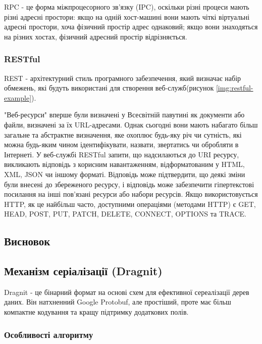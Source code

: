 \documentclass{lib/styles/default-style}
\begin{document}
    RPC - це форма міжпроцесорного зв'язку (IPC), оскільки різні процеси
    мають різні адресні простори: якщо на одній хост-машині вони мають чіткі віртуальні
    адресні простори, хоча фізичний простір адрес однаковий; якщо вони знаходяться на різних хостах,
    фізичний адресний простір відрізняється.

    \subsubsection{RESTful}
    
    REST - архітектурний стиль програмного забезпечення, який визначає набір обмежень,
    які будуть використані для створення веб-служб(рисунок \ref{img:restful-example}).
    

    "Веб-ресурси" вперше були визначені у Всесвітній павутині як документи або файли, визначені за їх URL-адресами.
    Однак сьогодні вони мають набагато більш загальне та абстрактне визначення, яке охоплює будь-яку річ чи сутність,
    які можна будь-яким чином ідентифікувати, назвати, звертатись чи обробляти в Інтернеті.
    У веб-службі RESTful запити, що надсилаються до URI ресурсу, викликають відповідь з корисним навантаженням,
    відформатованим у HTML, XML, JSON чи іншому форматі. Відповідь може підтвердити, що деякі зміни були внесені
    до збереженого ресурсу, і відповідь може забезпечити гіпертекстові посилання на інші пов'язані ресурси або набори ресурсів.
    Якщо використовується HTTP, як це найбільш часто, доступними операціями (методами HTTP) є GET, HEAD, POST, PUT,
    PATCH, DELETE, CONNECT, OPTIONS та TRACE.
    

    \subsection{Висновок}


\subsection{Механізм серіалізації (Dragnit)}
    Dragnit - це бінарний формат на основі схем для ефективної сереалізації дерев даних. Він натхненний
    Google Protobuf, але простіший, проте має більш компактне кодування та кращу підтримку додаткових полів.
    
    \subsubsection{Особливості алгоритму}
\end{document}
